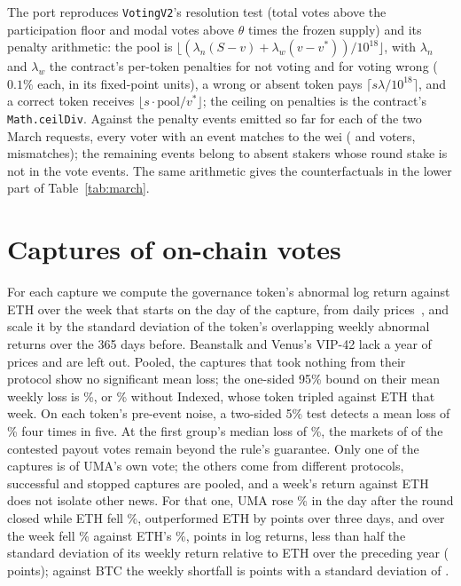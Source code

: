 \documentclass[conference,compsoc]{IEEEtran}
\begin{document}
 The port reproduces \texttt{VotingV2}'s resolution test (total votes above the participation floor and modal votes above $\theta$ times the frozen supply) and its penalty arithmetic: the pool is $\lfloor(\lambda_n (S - v) + \lambda_w (v - v^{*}))/10^{18}\rfloor$, with $\lambda_n$ and $\lambda_w$ the contract's per-token penalties for not voting and for voting wrong ($0.1\%$ each, in its fixed-point units), a wrong or absent token pays $\lceil s\lambda / 10^{18}\rceil$, and a correct token receives $\lfloor s\cdot\text{pool}/v^{*}\rfloor$; the ceiling on penalties is the contract's \texttt{Math.ceilDiv}. Against the \portEvents{} penalty events emitted so far for each of the two March requests, every voter with an event matches to the wei (\portMatchedA{} and \portMatchedB{} voters, \portMismatched{} mismatches); the remaining events belong to absent stakers whose round stake is not in the vote events. The same arithmetic gives the counterfactuals in the lower part of Table~\ref{tab:march}.

\section{Captures of on-chain votes}
\label{app:delta}
 For each capture we compute the governance token's abnormal log return against ETH over the week that starts on the day of the capture, from daily prices~\cite{defillama}, and scale it by the standard deviation of the token's overlapping weekly abnormal returns over the 365 days before. Beanstalk and Venus's VIP-42 lack a year of prices and are left out. Pooled, the captures that took nothing from their protocol show no significant mean loss; the one-sided 95\% bound on their mean weekly loss is \deltaBoundAllPct\%, or \deltaBoundWoPct\% without Indexed, whose token tripled against ETH that week. On each token's pre-event noise, a two-sided 5\% test detects a mean loss of \deltaDetectablePct\% four times in five. At the first group's median loss of \deltaDrainedMedianPct\%, the markets of \deltaUnprotectedAtDrainedMedian{} of the \rampMarkets{} contested payout votes remain beyond the rule's guarantee. Only one of the captures is of UMA's own vote; the others come from different protocols, successful and stopped captures are pooled, and a week's return against ETH does not isolate other news. For that one, UMA rose \econUmaOne\% in the day after the round closed while ETH fell \econEthOneAbs\%, outperformed ETH by \econAbnEthThree{} points over three days, and over the week fell \econUmaSevenAbs\% against ETH's \econEthSevenAbs\%, \econAbnEthSevenAbs{} points in log returns, less than half the standard deviation of its weekly return relative to ETH over the preceding year (\econSdEthSeven{} points); against BTC the weekly shortfall is \econAbnBtcSevenAbs{} points with a standard deviation of \econSdBtcSeven.
\end{document}
